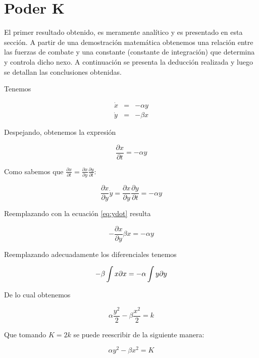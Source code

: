 \documentclass[a4paper,10pt]{article}
\begin{document}
\section{Poder K}

El primer resultado obtenido, es meramente analítico y es presentado en esta sección. A partir de una demostración matemática
obtenemos una relación entre las fuerzas de combate y una constante (constante de integración) que determina y controla dicho nexo. 
A continuación se presenta la deducción realizada y luego se detallan las conclusiones obtenidas.

Tenemos

\begin{eqnarray}
\dot{x} & = & -\alpha y\label{eq:ydot}\\
\dot{y} & = & -\beta x\end{eqnarray}


Despejando, obtenemos la expresión

\begin{equation}
\frac{\partial x}{\partial t}=-\alpha y\end{equation}


Como sabemos que $\frac{\partial x}{\partial t}=\frac{\partial x}{\partial y}\frac{\partial y}{\partial t}$:

\begin{equation}
\frac{\partial x}{\partial y}\dot{y}=\frac{\partial x}{\partial y}\frac{\partial y}{\partial t}=-\alpha y\end{equation}


Reemplazando con la ecuación \ref{eq:ydot} resulta

\begin{equation}
-\frac{\partial x}{\partial y}\beta x=-\alpha y\end{equation}


Reemplazando adecuadamente los diferenciales tenemos 

\begin{equation}
-\beta\intop x\partial x=-\alpha\int y\partial y\end{equation}


De lo cual obtenemos

\begin{equation}
\alpha\frac{y^{2}}{2}-\beta\frac{x^{2}}{2}=k\end{equation}


Que tomando $K=2k$ se puede reescribir de la siguiente manera:

\begin{equation}
\alpha y^{2}-\beta x^{2}=K\label{eq:obtenida}\end{equation}
\end{document}
